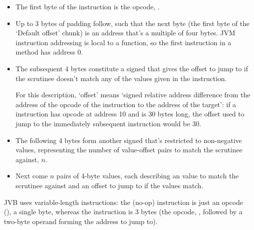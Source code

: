 \documentclass[dissertation.tex]{subfiles}
\begin{document}
{{{            \begin{itemize}
            \item
            {
                The first byte of the instruction is the opcode, .
            }
            \item
            {

                Up to 3 bytes of padding follow, such that the next byte (the first byte of the `Default offset'
                chunk) is an address that's a multiple of four bytes. JVM instruction addressing is local to a
                function, so the first instruction in a method has address 0.

            }
            \item
            {

                The subsequent 4 bytes constitute a signed  that gives the offset to jump to if the
                scrutinee doesn't match any of the values given in the instruction.

                For this description, `offset' means `signed relative address difference from the address of the
                opcode of the instruction to the address of the target': if a  instruction
                has opcode at address 10 and is 30 bytes long, the offset used to jump to the immediately subsequent
                instruction would be 30.

            }
            \item
            {

                The following 4 bytes form another signed  that's restricted to non-negative values,
                representing the number of value-offset pairs to match the scrutinee against, \(n\).

            }
            \item
            {

                Next come \(n\) pairs of 4-byte values, each describing an  value to match the scrutinee
                against and an offset to jump to if the values match.

            }
            \end{itemize}

            JVB uses variable-length instructions: the  (no-op) instruction is just an opcode
            (), a single byte, whereas the  instruction is 3 bytes (the opcode,
            , followed by a two-byte operand forming the address to jump to).

}}}
\end{document}
